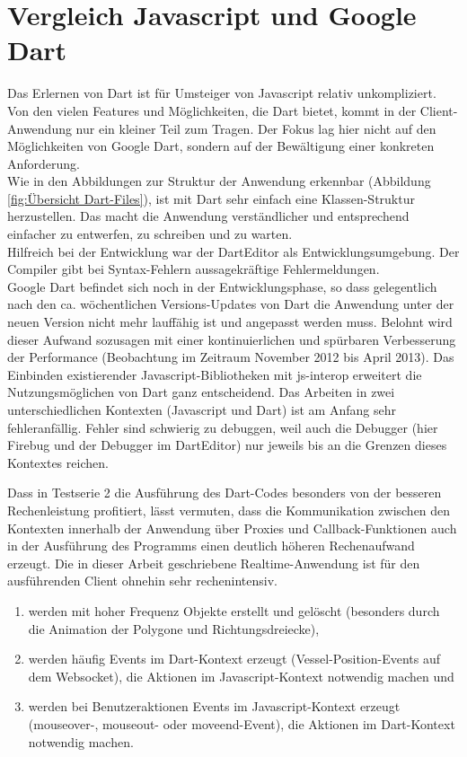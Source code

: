 \section{Vergleich Javascript und Google Dart}
Das Erlernen von Dart ist für Umsteiger von Javascript relativ unkompliziert. Von den vielen Features und Möglichkeiten, die Dart bietet, kommt in der Client-Anwendung nur ein kleiner Teil zum Tragen. Der Fokus lag hier nicht auf den Möglichkeiten von Google Dart, sondern auf der Bewältigung einer konkreten Anforderung. \\
Wie in den Abbildungen zur Struktur der Anwendung erkennbar (Abbildung \ref{fig:Übersicht Dart-Files}), ist mit Dart sehr einfach eine Klassen-Struktur herzustellen. Das macht die Anwendung verständlicher und entsprechend einfacher zu entwerfen, zu schreiben und zu warten.
\\
Hilfreich bei der Entwicklung war der DartEditor als Entwicklungsumgebung. Der Compiler gibt bei Syntax-Fehlern aussagekräftige Fehlermeldungen.\\  
Google Dart befindet sich noch in der Entwicklungsphase, so dass gelegentlich nach den ca. wöchentlichen Versions-Updates von Dart die Anwendung unter der neuen Version nicht mehr lauffähig ist und angepasst werden muss. Belohnt wird dieser Aufwand sozusagen mit einer kontinuierlichen und spürbaren Verbesserung der Performance (Beobachtung im Zeitraum November 2012 bis April 2013).
Das Einbinden existierender Javascript-Bibliotheken mit js-interop erweitert die Nutzungsmöglichen von Dart ganz entscheidend. Das Arbeiten in zwei unterschiedlichen Kontexten (Javascript und Dart) ist am Anfang sehr fehleranfällig. Fehler sind schwierig zu debuggen, weil auch die Debugger (hier Firebug und der Debugger im DartEditor) nur jeweils bis an die Grenzen dieses Kontextes reichen.

Dass in Testserie 2 die Ausführung des Dart-Codes besonders von der besseren Rechenleistung profitiert, lässt vermuten, dass die Kommunikation zwischen den Kontexten innerhalb der Anwendung über Proxies und Callback-Funktionen auch in der Ausführung des Programms einen deutlich höheren Rechenaufwand erzeugt.
Die in dieser Arbeit geschriebene Realtime-Anwendung ist für den ausführenden Client ohnehin sehr rechenintensiv.
\begin{enumerate}
\item werden mit hoher Frequenz Objekte erstellt und gelöscht (besonders durch die Animation der Polygone und Richtungsdreiecke), 
\item werden häufig Events im Dart-Kontext erzeugt (Vessel-Position-Events auf dem Websocket), die Aktionen im Javascript-Kontext notwendig machen und
\item werden bei Benutzeraktionen Events im Javascript-Kontext erzeugt (mouseover-, mouseout- oder moveend-Event), die Aktionen im Dart-Kontext notwendig machen.
\end{enumerate}

